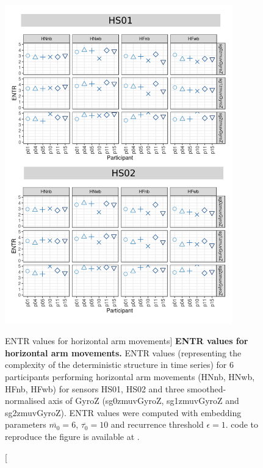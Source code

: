 \begin{figure}
\centering
\includegraphics[width=0.88\textwidth]{rqa_entr_H_w500}
    \caption
	[ENTR values for horizontal arm movements]{
	{\bf ENTR values for horizontal arm movements.}
	ENTR values (representing the complexity of the deterministic 
	structure in time series) for 
	6 participants performing horizontal arm movements 
	(HNnb, HNwb, HFnb, HFwb)
	for sensors HS01, HS02 and three smoothed-normalised axis 
	of GyroZ (sg0zmuvGyroZ, sg1zmuvGyroZ and sg2zmuvGyroZ).
	ENTR values were computed with 
	embedding parameters $\overline{m_0}=6$, $\overline{\tau_0}=10$ and
	recurrence threshold $\epsilon=1$.
		\R code to reproduce the figure is available at 
		.
        }
    \label{fig:rqa_entr_H}
\end{figure}
